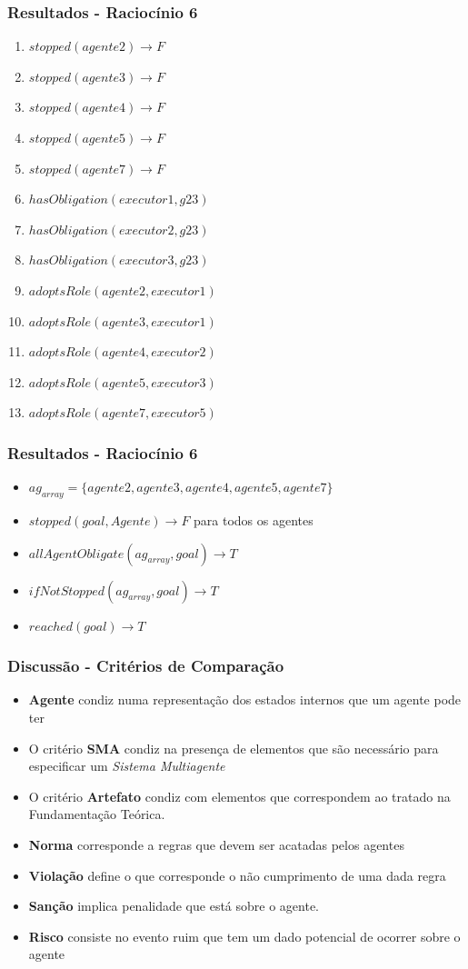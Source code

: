 \documentclass{beamer}
\begin{document}
\begin{frame}
	\frametitle{Resultados - Raciocínio 6}
	\begin{enumerate}
		\item $stopped(agente2) \to F$	
		\item $stopped(agente3) \to F$
		\item $stopped(agente4) \to F$
		\item $stopped(agente5) \to F$
		\item $stopped(agente7) \to F$
		\item $hasObligation(executor1,g23)$	
		\item $hasObligation(executor2,g23)$	
		\item $hasObligation(executor3,g23)$		
		\item $adoptsRole(agente2,executor1)$
		\item $adoptsRole(agente3,executor1)$
		\item $adoptsRole(agente4,executor2)$
		\item $adoptsRole(agente5,executor3)$
		\item $adoptsRole(agente7,executor5)$
	\end{enumerate}
\end{frame}
\begin{frame}
	\frametitle{Resultados - Raciocínio 6}
	\begin{itemize}
		\item $ag_{array} = \{ agente2,agente3,agente4,agente5,agente7 \}$
		\item $stopped(goal,Agente) \to F$ para todos os agentes		
		\item $allAgentObligate(ag_{array},goal) \to T$
		\item $ifNotStopped(ag_{array},goal) \to T$
		\item $reached(goal) \to T$
	\end{itemize}
\end{frame}
\begin{frame}
	\frametitle{Discussão - Critérios de Comparação}
	\begin{itemize}
		\item \textbf{Agente} condiz numa representação dos estados internos que um agente pode ter
		\item O critério \textbf{SMA} condiz na presença de elementos que são necessário para especificar um \textit{Sistema Multiagente}
		\item O critério \textbf{Artefato} condiz com elementos que correspondem ao tratado na Fundamentação Teórica.
		\item \textbf{Norma} corresponde a regras que devem ser acatadas pelos agentes 
		\item \textbf{Violação} define o que corresponde o não cumprimento de uma dada regra
		\item \textbf{Sanção} implica penalidade que está sobre o agente.
		\item \textbf{Risco} consiste no evento ruim que tem um dado potencial de ocorrer sobre o agente
	\end{itemize}
\end{frame}
\end{document}
